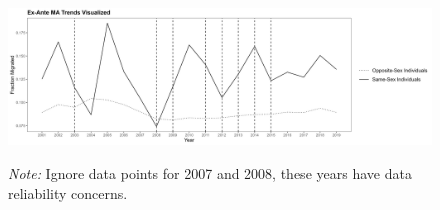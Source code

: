\documentclass[12pt,letterpaper]{article}
\begin{document}
\begin{figure}[h]
    \centering
    \includegraphics[width=0.75\linewidth]{outputs/summary_stats/MA_ante_trends.png}
    \caption{}
    \label{fig: MA_ante_trends}
    \begin{minipage}{0.85\textwidth}
    \small \textit{Note:} Ignore data points for 2007 and 2008, these years have data reliability concerns.
    \end{minipage}
\end{figure}
\end{document}
